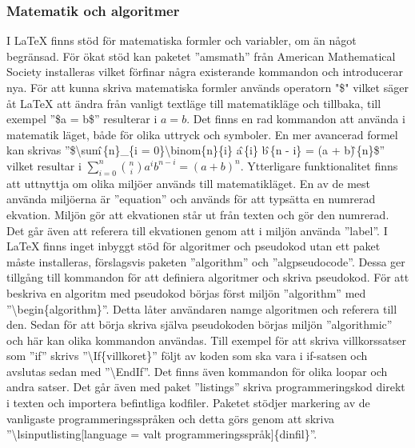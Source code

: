 \subsubsection{Matematik och algoritmer}
I {\LaTeX} finns stöd för matematiska formler och variabler, om än något begränsad. För ökat stöd kan paketet ''amsmath'' från American Mathematical Society installeras vilket förfinar några existerande kommandon och introducerar nya. För att kunna skriva matematiska formler används operatorn "\$" \hspace{0.2mm} vilket säger åt {\LaTeX} att ändra från vanligt textläge till matematikläge och tillbaka, till exempel ''\$a = b\$'' resulterar i $a = b$. Det finns en rad kommandon att använda i matematik läget, både för olika uttryck och symboler. En mer avancerad formel kan skrivas ''\$\textbackslash sum\^ \,\{n\}\_\{i = 0\}\textbackslash binom\{n\}\{i\} a\^ \,\{i\} b\^ \,\{n - i\} = (a + b)\^ \,\{n\}\$'' vilket resultar i $\sum^{n}_{i=0}\binom{n}{i}a^{i}b^{n-i} = (a + b)^{n}$. \citep{latexandfriends}
\newline
\newline
Ytterligare funktionalitet finns att uttnyttja om olika miljöer används till matematikläget. En av de mest använda miljöerna är ''equation'' och används för att typsätta en numrerad ekvation. Miljön gör att ekvationen står ut från texten och gör den numrerad. Det går även att referera till ekvationen genom att i miljön använda ''label''. \citep{latexandfriends}    
\newline
\newline
I {\LaTeX} finns inget inbyggt stöd för algoritmer och pseudokod utan ett paket måste installeras, förslagsvis paketen ''algorithm'' och ''algpseudocode''. Dessa ger tillgång till kommandon för att definiera algoritmer och skriva pseudokod. För att beskriva en algoritm med pseudokod börjas först miljön ''algorithm'' med ''\textbackslash begin\{algorithm\}''. Detta låter användaren namge algoritmen och referera till den. Sedan för att börja skriva själva pseudokoden börjas miljön ''algorithmic'' och här kan olika kommandon användas. Till exempel för att skriva villkorssatser som ''if'' skrivs ''\textbackslash If\{villkoret\}'' följt av koden som ska vara i if-satsen och avslutas sedan med ''\textbackslash EndIf''. Det finns även kommandon för olika loopar och andra satser. \citep{latexandfriends}
\newline
\newline
Det går även med paket ''listings'' skriva programmeringskod direkt i texten och importera befintliga kodfiler. Paketet stödjer markering av de vanligaste programmeringsspråken och detta görs genom att skriva ''\textbackslash lsinputlisting[language = valt programmeringsspråk]\{dinfil\}''. \citep{latexandfriends} 